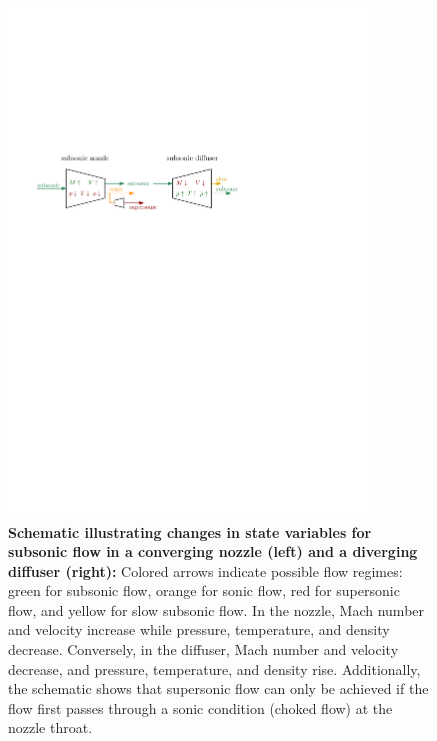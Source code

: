 		\begin{figure}[H]
		    \centering
		    \includegraphics[width=0.85\textwidth]{src/02_foundations/fig_variable-change-subsonic.pdf}
			\caption[Schematic illustrating changes in state variables for subsonic flow in a converging nozzle (left) and a diverging diffuser (right).]{
				\textbf{Schematic illustrating changes in state variables for subsonic flow in a converging nozzle (left) and a diverging diffuser (right):}
				Colored arrows indicate possible flow regimes: green for subsonic flow, orange for sonic flow, red for supersonic flow, and yellow for slow subsonic flow.
				In the nozzle, Mach number and velocity increase while pressure, temperature, and density decrease.
				Conversely, in the diffuser, Mach number and velocity decrease, and pressure, temperature, and density rise.
				Additionally, the schematic shows that supersonic flow can only be achieved if the flow first passes through a sonic condition (choked flow) at the nozzle throat.
				\cite{Cengel2017}
			}
		\end{figure}

